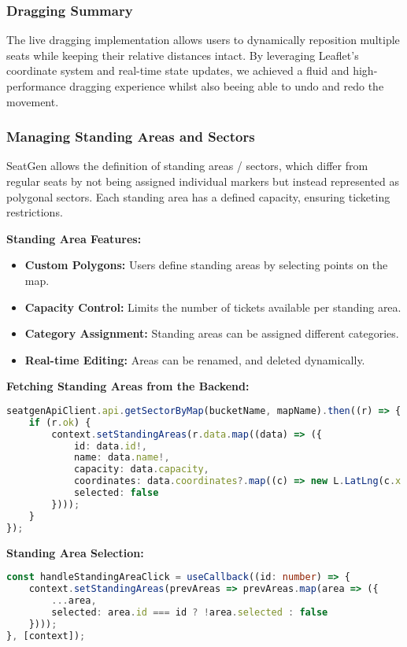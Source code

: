 \subsubsection{Dragging Summary}
The live dragging implementation allows users to dynamically reposition multiple seats while keeping their relative distances intact. By leveraging Leaflet’s coordinate system and real-time state updates, we achieved a fluid and high-performance dragging experience whilst also beeing able to undo and redo the movement.

\subsubsection{Managing Standing Areas and Sectors}

SeatGen allows the definition of standing areas / sectors, which differ from regular seats by not being assigned individual markers but instead represented as polygonal sectors. Each standing area has a defined capacity, ensuring ticketing restrictions.

\textbf{Standing Area Features:}
\begin{itemize}
    \item \textbf{Custom Polygons:} Users define standing areas by selecting points on the map.
    \item \textbf{Capacity Control:} Limits the number of tickets available per standing area.
    \item \textbf{Category Assignment:} Standing areas can be assigned different categories.
    \item \textbf{Real-time Editing:} Areas can be renamed, and deleted dynamically.
\end{itemize}

\textbf{Fetching Standing Areas from the Backend:}
\begin{lstlisting}[language=TypeScript, caption=Fetching Standing Areas, label=lst:fetch-standingareas]
seatgenApiClient.api.getSectorByMap(bucketName, mapName).then((r) => {
    if (r.ok) {
        context.setStandingAreas(r.data.map((data) => ({
            id: data.id!,
            name: data.name!,
            capacity: data.capacity,
            coordinates: data.coordinates?.map((c) => new L.LatLng(c.x!, c.y!)) ?? [],
            selected: false
        })));
    }
});
\end{lstlisting}

\textbf{Standing Area Selection:}
\begin{lstlisting}[language=TypeScript, caption=Handling Standing Area Selection, label=lst:select-standingareas]
const handleStandingAreaClick = useCallback((id: number) => {
    context.setStandingAreas(prevAreas => prevAreas.map(area => ({
        ...area,
        selected: area.id === id ? !area.selected : false
    })));
}, [context]);
\end{lstlisting}

